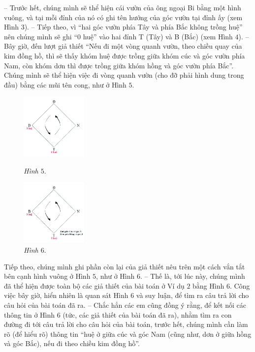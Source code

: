 	-- Trước hết, chúng mình sẽ thể hiện cái vườn của ông ngoại Bi bằng một hình vuông, và tại mỗi đỉnh của nó có ghi tên hướng của góc vườn tại đỉnh ấy (xem Hình $3$).
	\vskip 0.15cm
	-- Tiếp theo, vì “hai góc vườn phía Tây và phía Bắc không trồng huệ” nên chúng mình sẽ ghi “0 huệ” vào hai đỉnh T (Tây) và B (Bắc) (xem Hình $4$).
	\vskip 0.15cm
	-- Bây giờ, đến lượt giả thiết “Nếu đi một vòng quanh vườn, theo chiều quay của kim đồng hồ, thì sẽ thấy khóm huệ được trồng giữa khóm cúc và góc vườn phía Nam, còn khóm dơn thì được trồng giữa khóm hồng và góc vườn phía Bắc”. Chúng mình sẽ thể hiện việc đi vòng quanh vườn (cho đỡ phải hình dung trong đầu) bằng các mũi tên cong, như ở Hình $5$.
	\vskip 0.1cm
	\begin{figure}
		\vspace*{-15pt}
		\centering
		\captionsetup{labelformat=empty, justification=centering}
		\hspace*{-10pt}\includegraphics[width= 0.29\textwidth]{pic5}
		\caption{\textit{\small Hình $5.$}}
		\vspace*{5pt}
		\hspace*{-10pt}\includegraphics[width=0.29\textwidth]{pic6}
		\caption{\small\textit{Hình $6.$}}
		\vspace*{-20pt}
	\end{figure}
	\vskip 0.15cm
	Tiếp theo, chúng mình ghi phần còn lại của giả thiết nêu trên một cách vắn tắt bên cạnh hình vuông ở Hình $5$, như ở Hình $6$.
	\vskip 0.15cm
	-- Thế là, tới lúc này, chúng mình đã thể hiện được toàn bộ các giả thiết của bài toán ở Ví dụ $2$ bằng Hình $6$. Công việc bây giờ, hiển nhiên là quan sát Hình $6$ và suy luận, để tìm ra câu trả lời cho câu hỏi của bài toán đã ra.
	\vskip 0.15cm
	-- Chắc hẳn các em cũng đồng ý rằng, để kết nối các thông tin ở Hình $6$ (tức, các giả thiết của bài toán đã ra), nhằm tìm ra con đường đi tới câu trả lời cho câu hỏi của bài toán, trước hết, chúng mình cần làm rõ (để hiểu rõ) thông tin “huệ ở giữa cúc và góc Nam (cũng như, dơn ở giữa hồng và góc Bắc), nếu đi theo chiều kim đồng hồ”.
